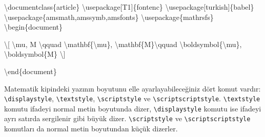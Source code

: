 \documentclass[
  letterpaper,
  DIV=11,
  numbers=noendperiod]{scrreprt}
\newenvironment{Shaded}{\begin{snugshade}}{\end{snugshade}}
\newcommand{\BuiltInTok}[1]{\textcolor[rgb]{0.00,0.23,0.31}{#1}}
\newcommand{\ExtensionTok}[1]{\textcolor[rgb]{0.00,0.23,0.31}{#1}}
\newcommand{\KeywordTok}[1]{\textcolor[rgb]{0.00,0.23,0.31}{#1}}
\newcommand{\NormalTok}[1]{\textcolor[rgb]{0.00,0.23,0.31}{#1}}
\newcommand{\SpecialCharTok}[1]{\textcolor[rgb]{0.37,0.37,0.37}{#1}}
\newcommand{\SpecialStringTok}[1]{\textcolor[rgb]{0.13,0.47,0.30}{#1}}
\begin{document}
\begin{Shaded}
\begin{Highlighting}[]
\BuiltInTok{\textbackslash{}documentclass}\NormalTok{\{}\ExtensionTok{article}\NormalTok{\}}
\BuiltInTok{\textbackslash{}usepackage}\NormalTok{[T1]\{}\ExtensionTok{fontenc}\NormalTok{\}}
\BuiltInTok{\textbackslash{}usepackage}\NormalTok{[turkish]\{}\ExtensionTok{babel}\NormalTok{\}}
\BuiltInTok{\textbackslash{}usepackage}\NormalTok{\{}\ExtensionTok{amsmath,amssymb,amsfonts}\NormalTok{\}}
\BuiltInTok{\textbackslash{}usepackage}\NormalTok{\{}\ExtensionTok{mathrsfs}\NormalTok{\}}
\KeywordTok{\textbackslash{}begin}\NormalTok{\{}\ExtensionTok{document}\NormalTok{\}}

\SpecialStringTok{\textbackslash{}[}
\SpecialCharTok{\textbackslash{}mu}\SpecialStringTok{, M }\SpecialCharTok{\textbackslash{}qquad}\SpecialStringTok{ }\SpecialCharTok{\textbackslash{}mathbf}\SpecialStringTok{\{}\SpecialCharTok{\textbackslash{}mu}\SpecialStringTok{\}, }\SpecialCharTok{\textbackslash{}mathbf}\SpecialStringTok{\{M\}}\SpecialCharTok{\textbackslash{}qquad}
\SpecialCharTok{\textbackslash{}boldsymbol}\SpecialStringTok{\{}\SpecialCharTok{\textbackslash{}mu}\SpecialStringTok{\}, }\SpecialCharTok{\textbackslash{}boldsymbol}\SpecialStringTok{\{M\}}
\SpecialStringTok{\textbackslash{}]}

\KeywordTok{\textbackslash{}end}\NormalTok{\{}\ExtensionTok{document}\NormalTok{\}}
\end{Highlighting}
\end{Shaded}

Matematik kipindeki yazının boyutunu elle ayarlayabileceğiniz dört komut
vardır: \texttt{\textbackslash{}displaystyle},
\texttt{\textbackslash{}textstyle}, \texttt{\textbackslash{}scriptstyle}
ve \texttt{\textbackslash{}scriptscriptstyle}.
\texttt{\textbackslash{}textstyle} komutu ifadeyi normal metin boyutunda
dizer, \texttt{\textbackslash{}displaystyle} komutu ise ifadeyi ayrı
satırda sergilenir gibi büyük dizer.
\texttt{\textbackslash{}scriptstyle} ve
\texttt{\textbackslash{}scriptscriptstyle} komutları da normal metin
boyutundan küçük dizerler.
\end{document}
